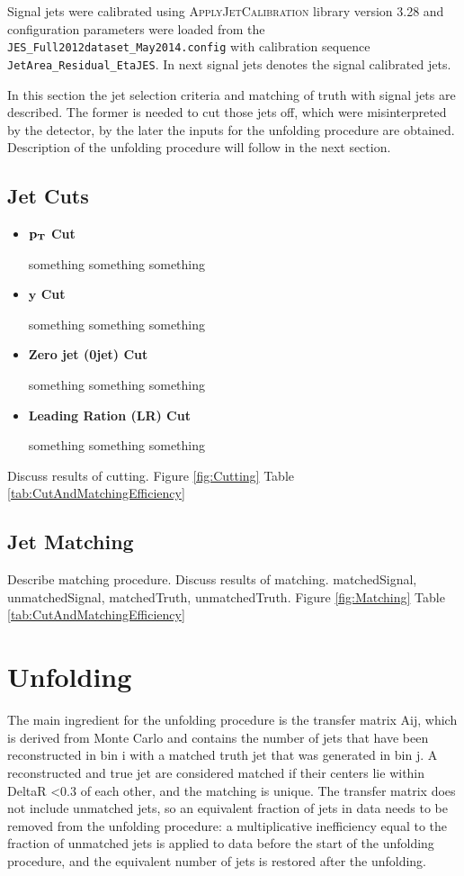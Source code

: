 Signal jets were calibrated using \textsc{ApplyJetCalibration} library version
3.28 and configuration parameters were loaded from the
\texttt{JES\_Full2012dataset\_May2014.config} with calibration sequence
\texttt{JetArea\_Residual\_EtaJES}. In next signal jets denotes the signal
calibrated jets.

In this section the jet selection criteria and matching of truth with signal
jets are described. The former is needed to cut those jets off, which were
misinterpreted by the detector, by the later the inputs for the unfolding
procedure are obtained. Description of the unfolding procedure will follow in
the next section.

\subsection{Jet Cuts}

\begin{itemize}
  \item \textbf{$\mathbf{p_{T}}$ Cut}

    something something something
  \item \textbf{$\mathbf{y}$ Cut}
    
    something something something
  \item \textbf{Zero jet (0jet) Cut}

    something something something
  \item \textbf{Leading Ration (LR) Cut}

    something something something
\end{itemize}

Discuss results of cutting. 
Figure \ref{fig:Cutting}
Table \ref{tab:CutAndMatchingEfficiency}

\subsection{Jet Matching}

Describe matching procedure.  
Discuss results of matching.
matchedSignal, unmatchedSignal, matchedTruth, unmatchedTruth.
Figure \ref{fig:Matching}
Table \ref{tab:CutAndMatchingEfficiency}


\section{Unfolding}

The main ingredient for the unfolding procedure is the transfer matrix Aij,
which is derived from Monte Carlo and contains the number of jets that have been
reconstructed in bin i with a matched truth jet that was generated in bin j. A
reconstructed and true jet are considered matched if their centers lie within
DeltaR <0.3 of each other, and the matching is unique. The transfer matrix does not
include unmatched jets, so an equivalent fraction of jets in data needs to be
removed from the unfolding procedure: a multiplicative inefficiency equal to the
fraction of unmatched jets is applied to data before the start of the unfolding
procedure, and the equivalent number of jets is restored after the unfolding.

